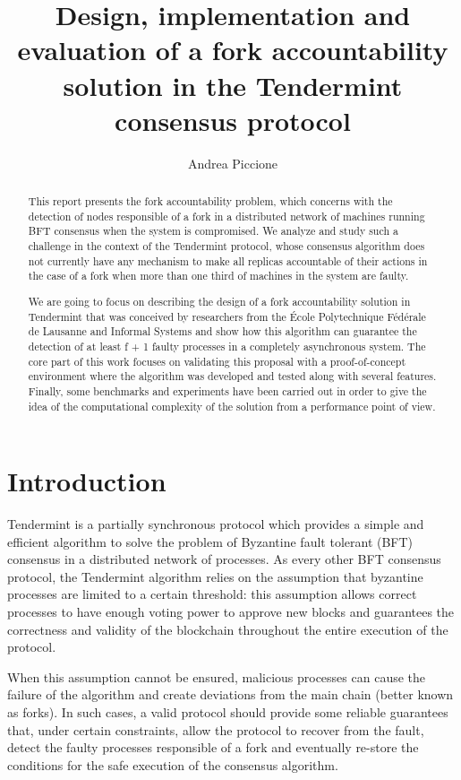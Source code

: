 \documentclass[a4paper,11pt,oneside]{report}
\title{Design, implementation and evaluation of a fork accountability\\solution in the Tendermint consensus protocol}
\author{Andrea Piccione}
\begin{document}
\maketitle

\begin{abstract}

This report presents the fork accountability problem, which concerns with the detection of nodes responsible of a fork in a distributed network of machines running BFT consensus when the system is compromised. We analyze and study such a challenge in the context of the Tendermint protocol, whose consensus algorithm does not currently have any mechanism to make all replicas accountable of their actions in the case of a fork when more than one third of machines in the system are faulty. 

We are going to focus on describing the design of a fork accountability solution in Tendermint that was conceived by researchers from the École Polytechnique Fédérale de Lausanne and Informal Systems and show how this algorithm can guarantee the detection of at least f + 1 faulty processes in a completely asynchronous system. The core part of this work focuses on validating this proposal with a proof-of-concept environment where the algorithm was developed and tested along with several features. Finally, some benchmarks and experiments have been carried out in order to give the idea of the computational complexity of the solution from a performance point of view.

\end{abstract}

\maketoc

\chapter{Introduction}

Tendermint is a partially synchronous protocol which provides a simple and efficient algorithm to solve the problem of Byzantine fault tolerant (BFT) consensus in a distributed network of processes. As every other BFT consensus protocol, the Tendermint algorithm relies on the assumption that byzantine processes are limited to a certain threshold: this assumption allows correct processes to have enough voting power to approve new blocks and guarantees the correctness and validity of the blockchain throughout the entire execution of the protocol. 

When this assumption cannot be ensured, malicious processes can cause the failure of the algorithm and create deviations from the main chain (better known as forks). In such cases, a valid protocol should provide some reliable guarantees that, under certain constraints, allow the protocol to recover from the fault, detect the faulty processes responsible of a fork and eventually re-store the conditions for the safe execution of the consensus algorithm.     
\end{document}
